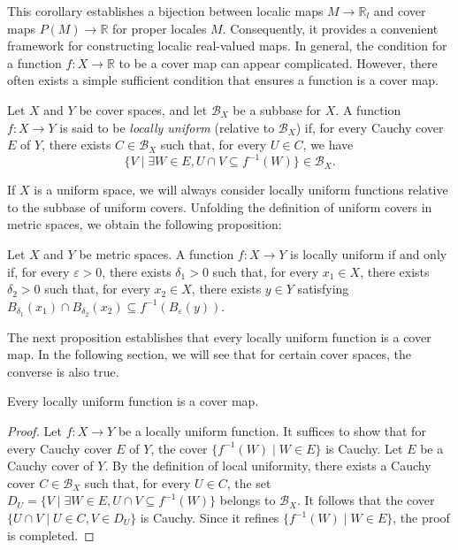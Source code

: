 \documentclass[pdflatex,sn-mathphys-num]{sn-jnl}
\theoremstyle{definition}
\theoremstyle{remark}
\numberwithin{figure}{section}
\begin{document}
This corollary establishes a bijection between localic maps $M \to \mathbb{R}_l$ and cover maps $P(M) \to \mathbb{R}$ for proper locales $M$.
Consequently, it provides a convenient framework for constructing localic real-valued maps.
In general, the condition for a function $f : X \to \mathbb{R}$ to be a cover map can appear complicated.
However, there often exists a simple sufficient condition that ensures a function is a cover map.

\begin{defn}
Let $X$ and $Y$ be cover spaces, and let $\mathcal{B}_X$ be a subbase for $X$.
A function $f : X \to Y$ is said to be \emph{locally uniform} (relative to $\mathcal{B}_X$) if, for every Cauchy cover $E$ of $Y$,
there exists $C \in \mathcal{B}_X$ such that, for every $U \in C$, we have
\[ \{ V \mid \exists W \in E, U \cap V \subseteq f^{-1}(W) \} \in \mathcal{B}_X. \]
\end{defn}

If $X$ is a uniform space, we will always consider locally uniform functions relative to the subbase of uniform covers.
Unfolding the definition of uniform covers in metric spaces, we obtain the following proposition:

\begin{prop}
Let $X$ and $Y$ be metric spaces.
A function $f : X \to Y$ is locally uniform if and only if, for every $\varepsilon > 0$, there exists $\delta_1 > 0$ such that,
for every $x_1 \in X$, there exists $\delta_2 > 0$ such that, for every $x_2 \in X$, there exists $y \in Y$ satisfying $B_{\delta_1}(x_1) \cap B_{\delta_2}(x_2) \subseteq f^{-1}(B_\varepsilon(y))$.
\end{prop}

The next proposition establishes that every locally uniform function is a cover map.
In the following section, we will see that for certain cover spaces, the converse is also true.

\begin{prop}
Every locally uniform function is a cover map.
\end{prop}
\begin{proof}
Let $f : X \to Y$ be a locally uniform function.
It suffices to show that for every Cauchy cover $E$ of $Y$, the cover $\{ f^{-1}(W) \mid W \in E \}$ is Cauchy.
Let $E$ be a Cauchy cover of $Y$.
By the definition of local uniformity, there exists a Cauchy cover $C \in \mathcal{B}_X$ such that, for every $U \in C$, the set
$D_U = \{ V \mid \exists W \in E, U \cap V \subseteq f^{-1}(W) \}$
belongs to $\mathcal{B}_X$.
It follows that the cover $\{ U \cap V \mid U \in C, V \in D_U \}$ is Cauchy.
Since it refines $\{ f^{-1}(W) \mid W \in E \}$, the proof is completed.
\end{proof}
\end{document}

